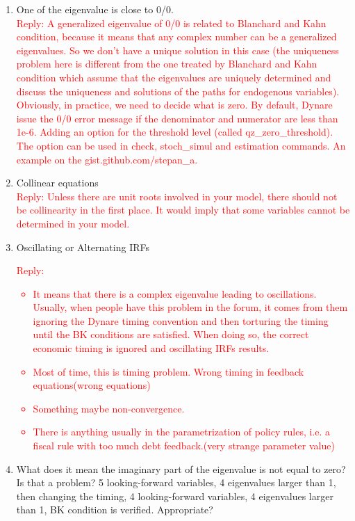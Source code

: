 \documentclass[cn,10pt,math=newtx,citestyle=gb7714-2015,bibstyle=gb7714-2015]{elegantbook}
\begin{document}
{{	\begin{enumerate}
		\item One of the eigenvalue is close to 0/0.\\
		\textcolor{red}{Reply: A generalized eigenvalue of 0/0 is related to Blanchard and Kahn condition, because it means that any complex number can be a generalized eigenvalues. So we don't have a unique solution in this case (the uniqueness problem here is different from the one treated by Blanchard and Kahn condition which assume that the eigenvalues are uniquely determined and discuss the uniqueness and solutions of the paths for endogenous variables). Obviously, in practice, we need to decide what is zero. By default, Dynare issue the 0/0 error message if the denominator and numerator are less than 1e-6. Adding an option for the threshold level (called qz\_zero\_threshold). The option can be used in check, stoch\_simul and estimation commands. An example on the gist.github.com/stepan\_a.}
		\item Collinear equations\\
		\textcolor{red}{Reply: Unless there are unit roots involved in your model, there should not be collinearity in the first place. It would imply that some variables cannot be determined in your model.}
		\item Oscillating or Alternating IRFs\\
		\textcolor{red}{Reply:
			\begin{itemize}
				\item It means that there is a complex eigenvalue leading to oscillations. Usually, when people have this problem in the forum, it comes from them ignoring the Dynare timing convention and then torturing the timing until the BK conditions are satisfied. When doing so, the correct economic timing is ignored and oscillating IRFs results.
				\item Most of time, this is timing problem. Wrong timing in feedback equations(wrong equations)
				\item Something maybe non-convergence.
				\item There is anything usually in the parametrization of policy rules, i.e. a fiscal rule with too much debt feedback.(very strange parameter value)
			\end{itemize}
		}
		\item What does it mean the imaginary part of the eigenvalue is not equal to zero? Is that a problem? 5 looking-forward variables, 4 eigenvalues larger than 1, then changing the timing, 4 looking-forward variables, 4 eigenvalues larger than 1, BK condition is verified. Appropriate?\\

\end{enumerate}}}
\end{document}
